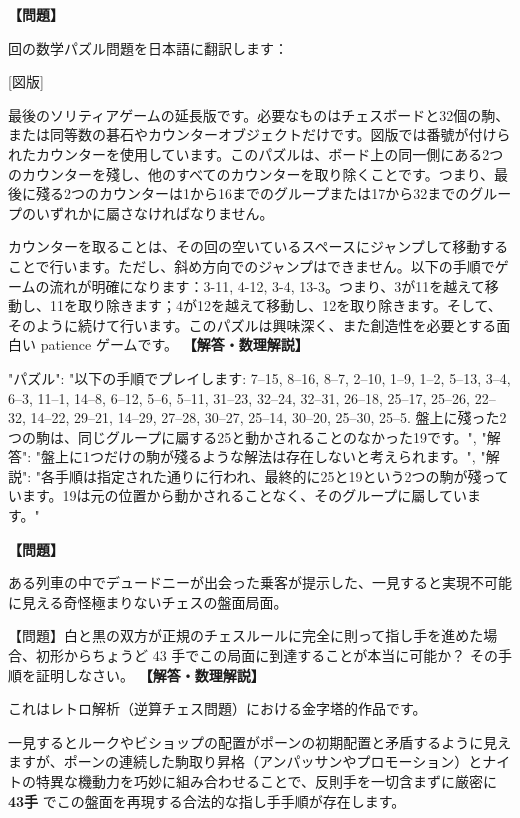 \documentclass[10pt,a4paper,oneside,openany]{ltjsbook}
\begin{document}
\begin{tcolorbox}[colback=softblue,colframe=primaryblue,title=\textbf{第 360 問：CHESSBOARD SOLITAIRE.},arc=2mm,boxrule=1pt,breakable]
\textbf{【問題】}\par\vspace{0.3em}
回の数学パズル問題を日本語に翻訳します：

[図版]

最後のソリティアゲームの延長版です。必要なものはチェスボードと32個の駒、または同等数の碁石やカウンターオブジェクトだけです。図版では番號が付けられたカウンターを使用しています。このパズルは、ボード上の同一側にある2つのカウンターを殘し、他のすべてのカウンターを取り除くことです。つまり、最後に殘る2つのカウンターは1から16までのグループまたは17から32までのグループのいずれかに屬さなければなりません。

カウンターを取ることは、その回の空いているスペースにジャンプして移動することで行います。ただし、斜め方向でのジャンプはできません。以下の手順でゲームの流れが明確になります：3-11, 4-12, 3-4, 13-3。つまり、3が11を越えて移動し、11を取り除きます；4が12を越えて移動し、12を取り除きます。そして、そのように続けて行います。このパズルは興味深く、また創造性を必要とする面白い patience ゲームです。
\tcblower
\textbf{【解答・数理解説】}\par\vspace{0.3em}
{
"パズル": "以下の手順でプレイします: 7--15, 8--16, 8--7, 2--10, 1--9, 1--2, 5--13, 3--4, 6--3, 11--1, 14--8, 6--12, 5--6, 5--11, 31--23, 32--24, 32--31, 26--18, 25--17, 25--26, 22--32, 14--22, 29--21, 14--29, 27--28, 30--27, 25--14, 30--20, 25--30, 25--5. 盤上に殘った2つの駒は、同じグループに屬する25と動かされることのなかった19です。",
"解答": "盤上に1つだけの駒が殘るような解法は存在しないと考えられます。",
"解説": "各手順は指定された通りに行われ、最終的に25と19という2つの駒が殘っています。19は元の位置から動かされることなく、そのグループに屬しています。"
}
\end{tcolorbox}

\begin{tcolorbox}[colback=softblue,colframe=primaryblue,title=\textbf{第 361 問：奇怪なチェス局面（逆算チェスプロブレム） （原題: THE MONSTROSITY.）},arc=2mm,boxrule=1pt,breakable]
\textbf{【問題】}\par\vspace{0.3em}
ある列車の中でデュードニーが出会った乗客が提示した、一見すると実現不可能に見える奇怪極まりないチェスの盤面局面。

【問題】白と黒の双方が正規のチェスルールに完全に則って指し手を進めた場合、初形からちょうど 43 手でこの局面に到達することが本当に可能か？ その手順を証明しなさい。
\tcblower
\textbf{【解答・数理解説】}\par\vspace{0.3em}
これはレトロ解析（逆算チェス問題）における金字塔的作品です。

一見するとルークやビショップの配置がポーンの初期配置と矛盾するように見えますが、ポーンの連続した駒取り昇格（アンパッサンやプロモーション）とナイトの特異な機動力を巧妙に組み合わせることで、反則手を一切含まずに厳密に \textbf{43手} でこの盤面を再現する合法的な指し手手順が存在します。
\end{tcolorbox}
\end{document}

